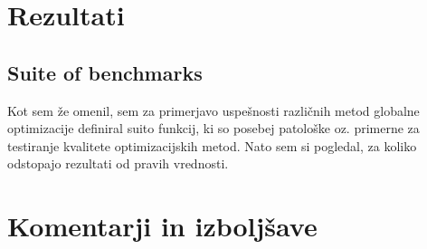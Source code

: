 \documentclass[a4paper]{article}
\begin{document}
\section{Rezultati}
\subsection{Suite of benchmarks}
Kot sem že omenil, sem za primerjavo uspešnosti različnih metod globalne optimizacije definiral suito funkcij, ki so
posebej patološke oz. primerne za testiranje kvalitete optimizacijskih metod. Nato sem si pogledal, za koliko odstopajo
rezultati od pravih vrednosti. 

\section{Komentarji in izboljšave}

\newpage


\end{document}
